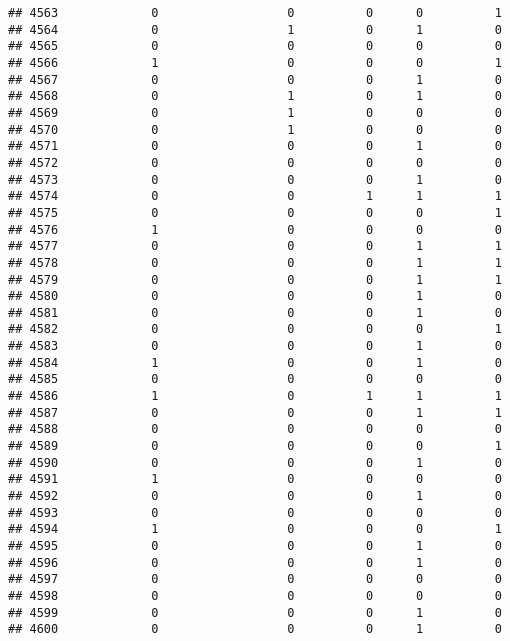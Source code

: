 \documentclass[
]{article}
\begin{document}
\begin{verbatim}
## 4563             0                  0          0      0          1
## 4564             0                  1          0      1          0
## 4565             0                  0          0      0          0
## 4566             1                  0          0      0          1
## 4567             0                  0          0      1          0
## 4568             0                  1          0      1          0
## 4569             0                  1          0      0          0
## 4570             0                  1          0      0          0
## 4571             0                  0          0      1          0
## 4572             0                  0          0      0          0
## 4573             0                  0          0      1          0
## 4574             0                  0          1      1          1
## 4575             0                  0          0      0          1
## 4576             1                  0          0      0          0
## 4577             0                  0          0      1          1
## 4578             0                  0          0      1          1
## 4579             0                  0          0      1          1
## 4580             0                  0          0      1          0
## 4581             0                  0          0      1          0
## 4582             0                  0          0      0          1
## 4583             0                  0          0      1          0
## 4584             1                  0          0      1          0
## 4585             0                  0          0      0          0
## 4586             1                  0          1      1          1
## 4587             0                  0          0      1          1
## 4588             0                  0          0      0          0
## 4589             0                  0          0      0          1
## 4590             0                  0          0      1          0
## 4591             1                  0          0      0          0
## 4592             0                  0          0      1          0
## 4593             0                  0          0      0          0
## 4594             1                  0          0      0          1
## 4595             0                  0          0      1          0
## 4596             0                  0          0      1          0
## 4597             0                  0          0      0          0
## 4598             0                  0          0      0          0
## 4599             0                  0          0      1          0
## 4600             0                  0          0      1          0

\end{verbatim}
\end{document}
